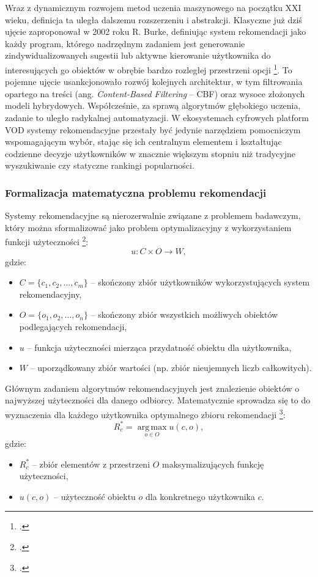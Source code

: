Wraz z dynamicznym rozwojem metod uczenia maszynowego na początku XXI wieku, definicja ta uległa dalszemu rozszerzeniu i abstrakcji. Klasyczne już dziś ujęcie zaproponował w 2002 roku R. Burke, definiując system rekomendacji jako każdy program, którego nadrzędnym zadaniem jest generowanie zindywidualizowanych sugestii lub aktywne kierowanie użytkownika do interesujących go obiektów w obrębie bardzo rozległej przestrzeni opcji \footcite{burkeHybridRecommenderSystems2002}. To pojemne ujęcie usankcjonowało rozwój kolejnych architektur, w tym filtrowania opartego na treści (ang. \foreignlanguage{english}{\textit{Content-Based Filtering}} -- CBF) oraz wysoce złożonych modeli hybrydowych. Współcześnie, za sprawą algorytmów głębokiego uczenia, zadanie to uległo radykalnej automatyzacji. W ekosystemach cyfrowych platform VOD systemy rekomendacyjne przestały być jedynie narzędziem pomocniczym wspomagającym wybór, stając się ich centralnym elementem i kształtując codzienne decyzje użytkowników w znacznie większym stopniu niż tradycyjne wyszukiwanie czy statyczne rankingi popularności.

\subsubsection{Formalizacja matematyczna problemu rekomendacji}

Systemy rekomendacyjne są nierozerwalnie związane z problemem badawczym, który można sformalizować jako problem optymalizacyjny z wykorzystaniem funkcji użyteczności \footcite[36--37]{malinowskiAlgorytmRekomendacjiBazujacy2022}:
\begin{equation}
    u \colon C \times O \to W,
\end{equation}
gdzie:
\begin{itemize}
    \item $C = \{c_1, c_2, \dots, c_m\}$ -- skończony zbiór użytkowników wykorzystujących system rekomendacyjny,
    \item $O = \{o_1, o_2, \dots, o_n\}$ -- skończony zbiór wszystkich możliwych obiektów podlegających rekomendacji,
    \item $u$ -- funkcja użyteczności mierząca przydatność obiektu dla użytkownika,
    \item $W$ -- uporządkowany zbiór wartości (np. zbiór nieujemnych liczb całkowitych).
\end{itemize}

Głównym zadaniem algorytmów rekomendacyjnych jest znalezienie obiektów o najwyższej użyteczności dla danego odbiorcy. Matematycznie sprowadza się to do wyznaczenia dla każdego użytkownika optymalnego zbioru rekomendacji \footcite{adomaviciusNextGenerationRecommender2005a}:
\begin{equation}
    R_c^* = \operatorname*{arg\,max}_{o \in O} u(c,o),
\end{equation}
gdzie:
\begin{itemize}
    \item $R_c^*$ -- zbiór elementów z przestrzeni $O$ maksymalizujących funkcję użyteczności,
    \item $u(c,o)$ -- użyteczność obiektu $o$ dla konkretnego użytkownika $c$.
\end{itemize}

